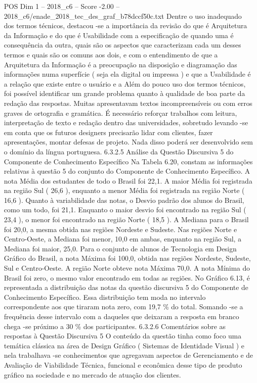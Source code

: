 \begin{textsample}{POS Dim 1 – 2018\_c6 – Score -2.00 – 2018\_c6/enade\_2018\_tec\_des\_graf\_b78dccf50c.txt}
Dentre o uso inadequado dos termos técnicos, destacou -se a importância da revisão do que é Arquitetura da Informação e do que é Usabilidade com a especificação de quando uma é consequência da outra, quais são os aspectos que caracterizam cada um desses termos e quais são os comuns aos dois, e com o entendimento de que a Arquitetura da Informação é a preocupação na disposição e diagramação das informações numa superfície ( seja ela digital ou impressa ) e que a Usabilidade é a relação que existe entre o usuário e a Além do pouco uso dos termos técnicos, foi possível identificar um grande problema quanto à qualidade de boa parte da redação das respostas.
Muitas apresentavam textos incompreensíveis ou com erros graves de ortografia e gramática.
É necessário reforçar trabalhos com leitura, interpretação de texto e redação dentro das universidades, sobretudo levando -se em conta que os futuros designers precisarão lidar com clientes, fazer apresentações, montar defesas de projeto.
Nada disso poderá ser desenvolvido sem o domínio da língua portuguesa. 6.3.2.5 Análise da Questão Discursiva 5 do Componente de Conhecimento Específico Na Tabela 6.20, constam as informações relativas à questão 5 do conjunto do Componente de Conhecimento Específico.
A nota Média dos estudantes de todo o Brasil foi 22,1.
A maior Média foi registrada na região Sul ( 26,6 ), enquanto a menor Média foi registrada na região Norte ( 16,6 ).
Quanto à variabilidade das notas, o Desvio padrão dos alunos do Brasil, como um todo, foi 21,1.
Enquanto o maior desvio foi encontrado na região Sul ( 23,4 ), o menor foi encontrado na região Norte ( 18,5 ).
A Mediana para o Brasil foi 20,0, a mesma obtida nas regiões Nordeste e Sudeste.
Nas regiões Norte e Centro-Oeste, a Mediana foi menor, 10,0 em ambas, enquanto na região Sul, a Mediana foi maior, 25,0.
Para o conjunto de alunos de Tecnologia em Design Gráfico do Brasil, a nota Máxima foi 100,0, obtida nas regiões Nordeste, Sudeste, Sul e Centro-Oeste.
A região Norte obteve nota Máxima 70,0.
A nota Mínima do Brasil foi zero, o mesmo valor encontrado em todas as regiões.
No Gráfico 6.13, é representada a distribuição das notas da questão discursiva 5 do Componente de Conhecimento Específico.
Essa distribuição tem moda no intervalo correspondente aos que tiraram nota zero, com 19,7 \% do total.
Somando -se a frequência desse intervalo com a daqueles que deixaram a resposta em branco chega -se próximo a 30 \% dos participantes. 6.3.2.6 Comentários sobre as respostas à Questão Discursiva 5 O conteúdo da questão tinha como foco uma temática clássica na área de Design Gráfico ( Sistemas de Identidade Visual ) e nela trabalhava -se conhecimentos que agregavam aspectos de Gerenciamento e de Avaliação de Viabilidade Técnica, funcional e econômica desse tipo de produto gráfico na sociedade e no mercado de atuação dos clientes.

\end{textsample}
